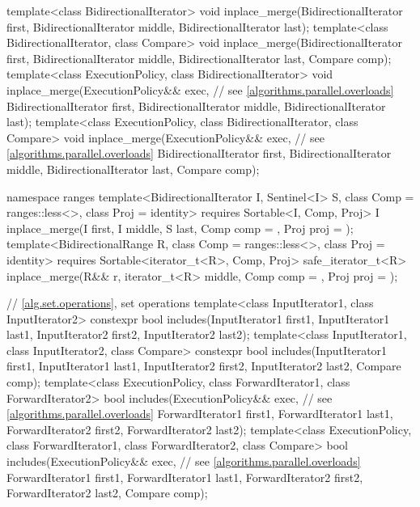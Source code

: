\begin{codeblock}
{  template<class BidirectionalIterator>
    void inplace_merge(BidirectionalIterator first,
                       BidirectionalIterator middle,
                       BidirectionalIterator last);
  template<class BidirectionalIterator, class Compare>
    void inplace_merge(BidirectionalIterator first,
                       BidirectionalIterator middle,
                       BidirectionalIterator last, Compare comp);
  template<class ExecutionPolicy, class BidirectionalIterator>
    void inplace_merge(ExecutionPolicy&& exec, // see \ref{algorithms.parallel.overloads}
                       BidirectionalIterator first,
                       BidirectionalIterator middle,
                       BidirectionalIterator last);
  template<class ExecutionPolicy, class BidirectionalIterator, class Compare>
    void inplace_merge(ExecutionPolicy&& exec, // see \ref{algorithms.parallel.overloads}
                       BidirectionalIterator first,
                       BidirectionalIterator middle,
                       BidirectionalIterator last, Compare comp);

  namespace ranges {
    template<BidirectionalIterator I, Sentinel<I> S, class Comp = ranges::less<>,
        class Proj = identity>
      requires Sortable<I, Comp, Proj>
      I inplace_merge(I first, I middle, S last, Comp comp = {}, Proj proj = {});
    template<BidirectionalRange R, class Comp = ranges::less<>, class Proj = identity>
      requires Sortable<iterator_t<R>, Comp, Proj>
      safe_iterator_t<R>
        inplace_merge(R&& r, iterator_t<R> middle, Comp comp = {},
                      Proj proj = {});
  }

  // \ref{alg.set.operations}, set operations
  template<class InputIterator1, class InputIterator2>
    constexpr bool includes(InputIterator1 first1, InputIterator1 last1,
                            InputIterator2 first2, InputIterator2 last2);
  template<class InputIterator1, class InputIterator2, class Compare>
    constexpr bool includes(InputIterator1 first1, InputIterator1 last1,
                            InputIterator2 first2, InputIterator2 last2,
                            Compare comp);
  template<class ExecutionPolicy, class ForwardIterator1, class ForwardIterator2>
    bool includes(ExecutionPolicy&& exec, // see \ref{algorithms.parallel.overloads}
                  ForwardIterator1 first1, ForwardIterator1 last1,
                  ForwardIterator2 first2, ForwardIterator2 last2);
  template<class ExecutionPolicy, class ForwardIterator1, class ForwardIterator2,
           class Compare>
    bool includes(ExecutionPolicy&& exec, // see \ref{algorithms.parallel.overloads}
                  ForwardIterator1 first1, ForwardIterator1 last1,
                  ForwardIterator2 first2, ForwardIterator2 last2,
                  Compare comp);

}
\end{codeblock}
